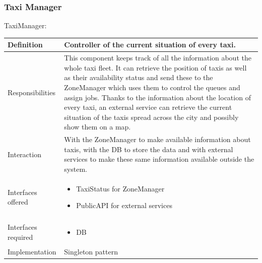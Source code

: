 \documentclass[a4paper,11pt]{report} %
\begin{document}
	\pagebreak
	\subsubsection{Taxi Manager}
	\begin{minipage}{\linewidth}
	\end{minipage} \linebreak
	\centerline{TaxiManager:}
	\begin{center}
		\begin{tabular}{| l | p{9cm} |}\hline
			Definition & Controller of the current situation of every taxi.\\\hline
			Responsibilities & This component keeps track of all the information about the whole taxi fleet. It can retrieve the position of taxis as well as their availability status and send these to the ZoneManager which uses them to control the queues and assign jobs. Thanks to the information about the location of every taxi, an external service can retrieve the current situation of the taxis spread across the city and possibly show them on a map.\\\hline
			Interaction & With the ZoneManager to make available information about taxis, with the DB to store the data and with external services to make these same information available outside the system.\\\hline
			Interfaces offered & \begin{itemize}
				\item TaxiStatus for ZoneManager
				\item PublicAPI for external services
			\end{itemize}\\\hline
			Interfaces required & \begin{itemize}
				\item DB
			\end{itemize}\\\hline
			Implementation & Singleton pattern\\\hline
		\end{tabular}
	\end{center}	
	
\end{document}
